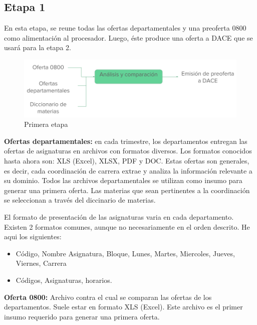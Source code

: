 \documentclass[]{article}
\begin{document}
\subsection{Etapa 1}\label{etapa-1}

En esta etapa, se reune todas las ofertas departamentales y una
preoferta 0800 como alimentación al procesador. Luego, éste produce una
oferta a DACE que se usará para la etapa 2.


\begin{figure}[!h]
  \includegraphics[width=\linewidth]{primera_etapa.png}
  \caption{Primera etapa}
  \label{fig:primera_etapa}
\end{figure}

\textbf{Ofertas departamentales:} en cada trimestre, los departamentos
entregan las ofertas de asignaturas en archivos con formatos diversos.
Los formatos conocidos hasta ahora son: XLS (Excel), XLSX, PDF y DOC.
Estas ofertas son generales, es decir, cada coordinación de carrera
extrae y analiza la información relevante a su dominio. Todos las
archivos departamentales se utilizan como insumo para generar una
primera oferta. Las materias que sean pertinentes a la coordinación se
seleccionan a través del diccinario de materias.

El formato de presentación de las asignaturas varia en cada
departamento. Existen 2 formatos comunes, aunque no necesariamente en el
orden descrito. He aqui los siguientes:

\begin{itemize}
\itemsep1pt\parskip0pt
\item
  Código, Nombre Asignatura, Bloque, Lunes, Martes, Miercoles, Jueves,
  Viernes, Carrera
\item
  Códigos, Asignaturas, horarios.
\end{itemize}

\textbf{Oferta 0800:} Archivo contra el cual se comparan las ofertas de
los departamentos. Suele estar en formato XLS (Excel). Este archivo es
el primer insumo requerido para generar una primera oferta.
\end{document}
